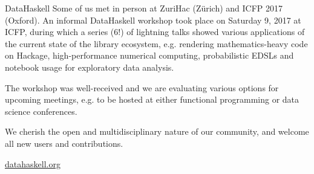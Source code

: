 \documentclass[DIV16,twocolumn,10pt]{scrreprt}
\begin{document}
\begin{hcarentry}{DataHaskell}
Some of us met in person at ZuriHac (Z\"{u}rich) and ICFP 2017 (Oxford). An informal DataHaskell workshop took place on Saturday 9, 2017 at ICFP, during which a series (6!) of lightning talks showed various applications of the current state of the library ecosystem, e.g. rendering mathematics-heavy code on Hackage, high-performance numerical computing, probabilistic EDSLs and notebook usage for exploratory data analysis. 

The workshop was well-received and we are evaluating various options for upcoming meetings, e.g. to be hosted at either functional programming or data science conferences.



We cherish the open and multidisciplinary nature of our community, and welcome all new users and contributions.

\FurtherReading
  \url{datahaskell.org}
\end{hcarentry}
\end{document}
